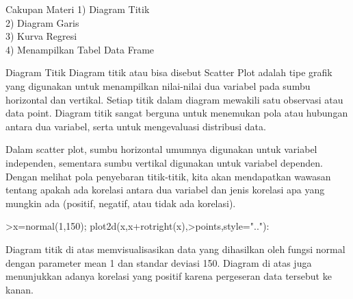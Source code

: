 \documentclass[a4paper,10pt]{article}
\begin{document}
\begin{eulernotebook}
\begin{eulercomment}
\begin{eulercomment}
\begin{eulercomment}
\begin{eulercomment}
\begin{eulercomment}
\begin{eulercomment}
\begin{eulercomment}
\begin{eulercomment}
\begin{eulercomment}
\begin{eulercomment}
\begin{eulercomment}
\begin{eulercomment}
\begin{eulercomment}
\begin{eulercomment}
\begin{eulercomment}
\begin{eulercomment}
\begin{eulercomment}
Cakupan Materi 1) Diagram Titik\\
2) Diagram Garis\\
3) Kurva Regresi\\
4) Menampilkan Tabel Data Frame

\end{eulercomment}
\eulersubheading{}
\begin{eulercomment}
Diagram Titik Diagram titik atau bisa disebut Scatter Plot adalah tipe
grafik yang digunakan untuk menampilkan nilai-nilai dua variabel pada
sumbu horizontal dan vertikal. Setiap titik dalam diagram mewakili
satu observasi atau data point. Diagram titik sangat berguna untuk
menemukan pola atau hubungan antara dua variabel, serta untuk
mengevaluasi distribusi data.

Dalam scatter plot, sumbu horizontal umumnya digunakan untuk variabel
independen, sementara sumbu vertikal digunakan untuk variabel
dependen. Dengan melihat pola penyebaran titik-titik, kita akan
mendapatkan wawasan tentang apakah ada korelasi antara dua variabel
dan jenis korelasi apa yang mungkin ada (positif, negatif, atau tidak
ada korelasi).

\end{eulercomment}
\begin{eulerprompt}
>x=normal(1,150); plot2d(x,x+rotright(x),>points,style=".."):
\end{eulerprompt}
\begin{eulercomment}
Diagram titik di atas memvisualisasikan data yang dihasilkan oleh
fungsi normal dengan parameter mean 1 dan standar deviasi 150. Diagram
di atas juga menunjukkan adanya korelasi yang positif karena
pergeseran data tersebut ke kanan.


\end{eulercomment}
\end{eulercomment}
\end{eulercomment}
\end{eulercomment}
\end{eulercomment}
\end{eulercomment}
\end{eulercomment}
\end{eulercomment}
\end{eulercomment}
\end{eulercomment}
\end{eulercomment}
\end{eulercomment}
\end{eulercomment}
\end{eulercomment}
\end{eulercomment}
\end{eulercomment}
\end{eulercomment}
\end{eulernotebook}
\end{document}
